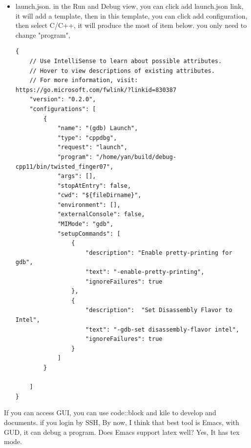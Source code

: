 \documentclass[a4paper,11pt,twoside]{book}
\begin{document}
\begin{itemize}
\begin{lstlisting}[mathescape=false]
{
    "version": "2.0.0",
    "tasks": [
        {
            "type": "cppbuild",
            "label": "C/C++: cpp build active file",
            "command": "/usr/bin/g++",
            "args": [
                "-g",
                "${file}",
                "-L",
                "/home/yan/build/debug-cpp11/lib",
                "-lmuduo_net",
                "-lmuduo_base",
                "-lmuduo_http",
                "-lmuduo_inspect",
                "-lmuduo_pubsub",
                "-lpthread",
                "-I",
                "/home/yan/muduo-master",
                "-DCHECK_PTHREAD_RETURN_VALUE -D_FILE_OFFSET_BITS=64 -Wall -Wextra -Werror -Wconversion -Wno-unused-parameter -Wold-style-cast -Woverloaded-virtual -Wpointer-arith -Wshadow -Wwrite-strings -march=native -std=c++11 -rdynamic ",
                "-o",
                "${fileDirname}/${fileBasenameNoExtension}"
            ],
            "options": {
                "cwd": "${fileDirname}"
            },
            "problemMatcher": [
                "$gcc"
            ],
            "group": "build",
            "detail": "compiler: /usr/bin/cpp"
        },
     ]
}
\end{lstlisting}

\item launch.json.  in the Run and Debug view, you can click add launch.json link, it will add a template, then in this template, you can click add configuration, then select C/C++, it will produce the most of item below. you only need to change "program", 

\begin{lstlisting}[mathescape=false]
{
    // Use IntelliSense to learn about possible attributes.
    // Hover to view descriptions of existing attributes.
    // For more information, visit: https://go.microsoft.com/fwlink/?linkid=830387
    "version": "0.2.0",
    "configurations": [
        {
            "name": "(gdb) Launch",
            "type": "cppdbg",
            "request": "launch",
            "program": "/home/yan/build/debug-cpp11/bin/twisted_finger07",
            "args": [],
            "stopAtEntry": false,
            "cwd": "${fileDirname}",
            "environment": [],
            "externalConsole": false,
            "MIMode": "gdb",
            "setupCommands": [
                {
                    "description": "Enable pretty-printing for gdb",
                    "text": "-enable-pretty-printing",
                    "ignoreFailures": true
                },
                {
                    "description":  "Set Disassembly Flavor to Intel",
                    "text": "-gdb-set disassembly-flavor intel",
                    "ignoreFailures": true
                }
            ]
        }

    ]
}
\end{lstlisting}
\end{itemize}
If you can access GUI, you can use code::block and kile to develop and documents. if
you login by SSH, By now, I think that best tool is Emacs, with GUD, it can debug a
program. Does Emacs support latex well? Yes, It has tex mode. \par
\end{document}
